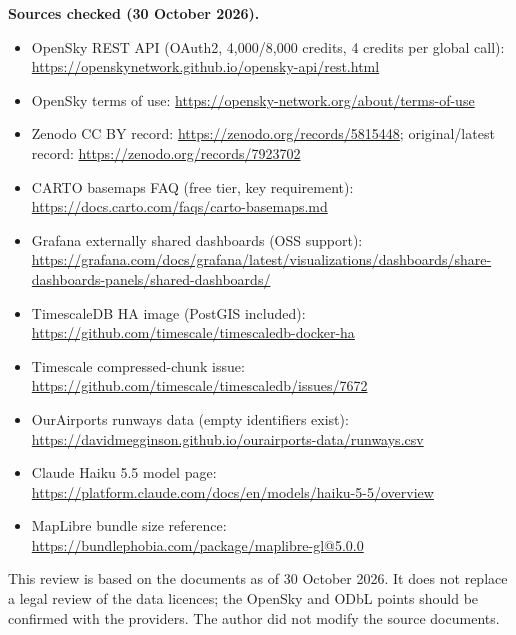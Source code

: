 \documentclass[10.5pt]{article}
\begin{document}
\vspace{4pt}
\begin{softcard}
{\bfseries Sources checked (30 October 2026).}
\begin{itemize}[leftmargin=1.05em,itemsep=1.5pt,topsep=2pt]
  \item OpenSky REST API (OAuth2, 4,000/8,000 credits, 4 credits per global call): \url{https://openskynetwork.github.io/opensky-api/rest.html}
  \item OpenSky terms of use: \url{https://opensky-network.org/about/terms-of-use}
  \item Zenodo CC BY record: \url{https://zenodo.org/records/5815448}; original/latest record: \url{https://zenodo.org/records/7923702}
  \item CARTO basemaps FAQ (free tier, key requirement): \url{https://docs.carto.com/faqs/carto-basemaps.md}
  \item Grafana externally shared dashboards (OSS support): \url{https://grafana.com/docs/grafana/latest/visualizations/dashboards/share-dashboards-panels/shared-dashboards/}
  \item TimescaleDB HA image (PostGIS included): \url{https://github.com/timescale/timescaledb-docker-ha}
  \item Timescale compressed-chunk  issue: \url{https://github.com/timescale/timescaledb/issues/7672}
  \item OurAirports runways data (empty identifiers exist): \url{https://davidmegginson.github.io/ourairports-data/runways.csv}
  \item Claude Haiku 5.5 model page: \url{https://platform.claude.com/docs/en/models/haiku-5-5/overview}
  \item MapLibre bundle size reference: \url{https://bundlephobia.com/package/maplibre-gl@5.0.0}
\end{itemize}
\end{softcard}

\vspace{3pt}
{\scriptsize\color{papermuted}
This review is based on the documents as of 30 October 2026. It does not replace a legal review of the data licences; the OpenSky and ODbL points should be confirmed with the providers. The author did not modify the source documents.
}
\end{document}
